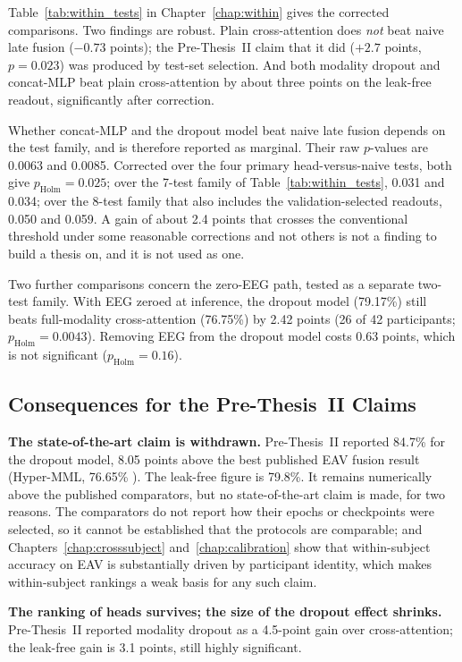 Table~\ref{tab:within_tests} in Chapter~\ref{chap:within} gives the corrected comparisons. Two findings are robust.
Plain cross-attention does \emph{not} beat naive late fusion ($-0.73$ points); the
Pre-Thesis~II claim that it did ($+2.7$ points, $p = 0.023$) was produced by test-set
selection. And both modality dropout and concat-MLP beat plain cross-attention by
about three points on the leak-free readout, significantly after correction.

Whether concat-MLP and the dropout model beat naive late fusion depends on the test
family, and is therefore reported as marginal. Their raw $p$-values are 0.0063 and
0.0085. Corrected over the four primary head-versus-naive tests, both give
$p_{\mathrm{Holm}} = 0.025$; over the 7-test family of Table~\ref{tab:within_tests},
0.031 and 0.034; over the 8-test family that also includes the validation-selected
readouts, 0.050 and 0.059. A gain of about 2.4 points that crosses the conventional
threshold under some reasonable corrections and not others is not a finding to build a
thesis on, and it is not used as one.

Two further comparisons concern the zero-EEG path, tested as a separate two-test
family. With EEG zeroed at inference, the dropout model (79.17\%) still beats
full-modality cross-attention (76.75\%) by 2.42 points (26 of 42 participants;
$p_{\mathrm{Holm}} = 0.0043$). Removing EEG from the dropout model costs 0.63 points,
which is not significant ($p_{\mathrm{Holm}} = 0.16$).

\subsection{Consequences for the Pre-Thesis~II Claims}

\textbf{The state-of-the-art claim is withdrawn.} Pre-Thesis~II reported 84.7\% for
the dropout model, 8.05 points above the best published EAV fusion result (Hyper-MML,
76.65\% \cite{Kang2025HyperMML}). The leak-free figure is 79.8\%. It remains
numerically above the published comparators, but no state-of-the-art claim is made,
for two reasons. The comparators do not report how their epochs or checkpoints were
selected, so it cannot be established that the protocols are comparable; and
Chapters~\ref{chap:crosssubject} and~\ref{chap:calibration} show that within-subject
accuracy on EAV is substantially driven by participant identity, which makes
within-subject rankings a weak basis for any such claim.

\textbf{The ranking of heads survives; the size of the dropout effect shrinks.}
Pre-Thesis~II reported modality dropout as a 4.5-point gain over cross-attention; the
leak-free gain is 3.1 points, still highly significant.

